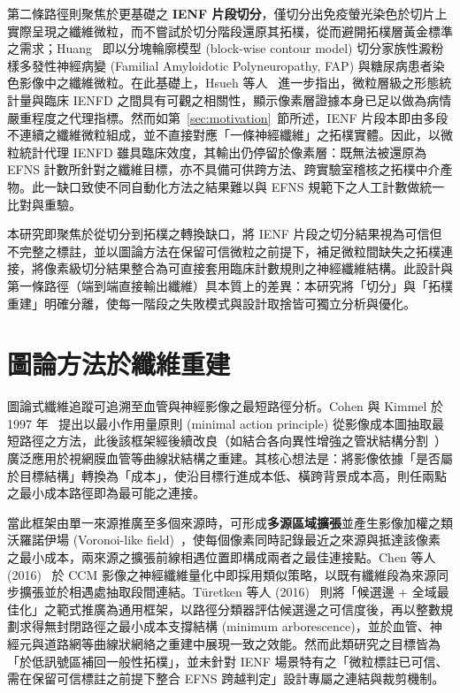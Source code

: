 第二條路徑則聚焦於更基礎之 \textbf{IENF 片段切分}，僅切分出免疫螢光染色於切片上實際呈現之纖維微粒，而不嘗試於切分階段還原其拓樸，從而避開拓樸層黃金標準之需求；Huang~\cite{huang2026automated} 即以分塊輪廓模型 (block-wise contour model) 切分家族性澱粉樣多發性神經病變 (Familial Amyloidotic Polyneuropathy, FAP) 與糖尿病患者染色影像中之纖維微粒。在此基礎上，Hsueh 等人~\cite{hsueh2026machine} 進一步指出，微粒層級之形態統計量與臨床 IENFD 之間具有可觀之相關性，顯示像素層證據本身已足以做為病情嚴重程度之代理指標。然而如第~\ref{sec:motivation}~節所述，IENF 片段本即由多段不連續之纖維微粒組成，並不直接對應「一條神經纖維」之拓樸實體。因此，以微粒統計代理 IENFD 雖具臨床效度，其輸出仍停留於像素層：既無法被還原為 EFNS 計數所針對之纖維目標，亦不具備可供跨方法、跨實驗室稽核之拓樸中介產物。此一缺口致使不同自動化方法之結果難以與 EFNS 規範下之人工計數做統一比對與重驗。

本研究即聚焦於從切分到拓樸之轉換缺口，將 IENF 片段之切分結果視為可信但不完整之標註，並以圖論方法在保留可信微粒之前提下，補足微粒間缺失之拓樸連接，將像素級切分結果整合為可直接套用臨床計數規則之神經纖維結構。此設計與第一條路徑（端到端直接輸出纖維）具本質上的差異：本研究將「切分」與「拓樸重建」明確分離，使每一階段之失敗模式與設計取捨皆可獨立分析與優化。

\section{圖論方法於纖維重建}
\label{sec:graph-tracing}

圖論式纖維追蹤可追溯至血管與神經影像之最短路徑分析。Cohen 與 Kimmel 於 1997 年~\cite{cohen1997global} 提出以最小作用量原則 (minimal action principle) 從影像成本圖抽取最短路徑之方法，此後該框架經後續改良（如結合各向異性增強之管狀結構分割~\cite{benmansour2011tubular}）廣泛應用於視網膜血管等曲線狀結構之重建。其核心想法是：將影像依據「是否屬於目標結構」轉換為「成本」，使沿目標行進成本低、橫跨背景成本高，則任兩點之最小成本路徑即為最可能之連接。

當此框架由單一來源推廣至多個來源時，可形成\textbf{多源區域擴張}並產生影像加權之類沃羅諾伊場 (Voronoi-like field)~\cite{felzenszwalb2012distance}，使每個像素同時記錄最近之來源與抵達該像素之最小成本，兩來源之擴張前線相遇位置即構成兩者之最佳連接點。Chen 等人 (2016)~\cite{chen2016automatic} 於 CCM 影像之神經纖維量化中即採用類似策略，以既有纖維段為來源同步擴張並於相遇處抽取段間連結。Türetken 等人 (2016)~\cite{turetken2016reconstructing} 則將「候選邊 + 全域最佳化」之範式推廣為通用框架，以路徑分類器評估候選邊之可信度後，再以整數規劃求得無封閉路徑之最小成本支撐結構 (minimum arborescence)，並於血管、神經元與道路網等曲線狀網絡之重建中展現一致之效能。然而此類研究之目標皆為「於低訊號區補回一般性拓樸」，並未針對 IENF 場景特有之「微粒標註已可信、需在保留可信標註之前提下整合 EFNS 跨越判定」設計專屬之連結與裁剪機制。

